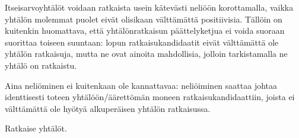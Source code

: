 \begin{tehtavasivu}
\begin{tehtava}
	Itseisarvoyhtälöt voidaan ratkaista usein kätevästi neliöön korottamalla, vaikka yhtälön molemmat puolet eivät olisikaan välttämättä positiivisia. Tällöin on kuitenkin huomattava, että yhtälönratkaisun päättelyketjua ei voida suoraan suorittaa toiseen suuntaan: lopun ratkaisukandidaatit eivät välttämättä ole yhtälön ratkaisuja, mutta ne ovat ainoita mahdollisia, jolloin tarkistamalla ne yhtälö on ratkaistu. 

	Aina neliöminen ei kuitenkaan ole kannattavaa: neliöiminen saattaa johtaa identtisesti toteen yhtälöön/äärettömän moneen ratkaisukandidaattiin, joista ei välttämättä ole hyötyä alkuperäisen yhtälön ratkaisussa.

	Ratkaise yhtälöt.
	\begin{vastaus}
	\end{vastaus}
\end{tehtava}

\end{tehtavasivu}
